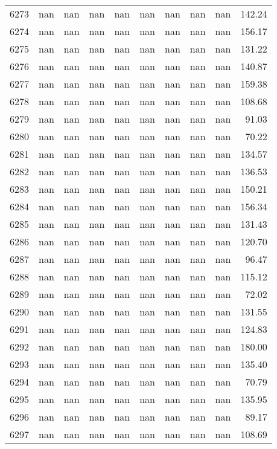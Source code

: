 \begin{tabular}{lrrrrrrrrr}
6273 & nan & nan & nan & nan & nan & nan & nan & nan & 142.24 \\
6274 & nan & nan & nan & nan & nan & nan & nan & nan & 156.17 \\
6275 & nan & nan & nan & nan & nan & nan & nan & nan & 131.22 \\
6276 & nan & nan & nan & nan & nan & nan & nan & nan & 140.87 \\
6277 & nan & nan & nan & nan & nan & nan & nan & nan & 159.38 \\
6278 & nan & nan & nan & nan & nan & nan & nan & nan & 108.68 \\
6279 & nan & nan & nan & nan & nan & nan & nan & nan & 91.03 \\
6280 & nan & nan & nan & nan & nan & nan & nan & nan & 70.22 \\
6281 & nan & nan & nan & nan & nan & nan & nan & nan & 134.57 \\
6282 & nan & nan & nan & nan & nan & nan & nan & nan & 136.53 \\
6283 & nan & nan & nan & nan & nan & nan & nan & nan & 150.21 \\
6284 & nan & nan & nan & nan & nan & nan & nan & nan & 156.34 \\
6285 & nan & nan & nan & nan & nan & nan & nan & nan & 131.43 \\
6286 & nan & nan & nan & nan & nan & nan & nan & nan & 120.70 \\
6287 & nan & nan & nan & nan & nan & nan & nan & nan & 96.47 \\
6288 & nan & nan & nan & nan & nan & nan & nan & nan & 115.12 \\
6289 & nan & nan & nan & nan & nan & nan & nan & nan & 72.02 \\
6290 & nan & nan & nan & nan & nan & nan & nan & nan & 131.55 \\
6291 & nan & nan & nan & nan & nan & nan & nan & nan & 124.83 \\
6292 & nan & nan & nan & nan & nan & nan & nan & nan & 180.00 \\
6293 & nan & nan & nan & nan & nan & nan & nan & nan & 135.40 \\
6294 & nan & nan & nan & nan & nan & nan & nan & nan & 70.79 \\
6295 & nan & nan & nan & nan & nan & nan & nan & nan & 135.95 \\
6296 & nan & nan & nan & nan & nan & nan & nan & nan & 89.17 \\
6297 & nan & nan & nan & nan & nan & nan & nan & nan & 108.69 \\

\end{tabular}

